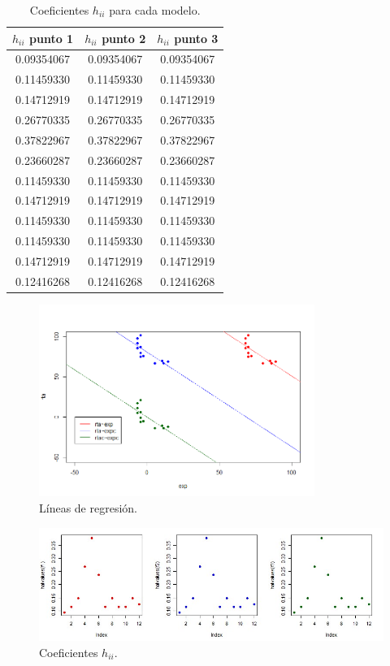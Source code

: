 \documentclass[a4paper]{article}
\begin{document}
\begin{table}
    \centering
    \begin{tabular}{c c c}
    $h_{ii}$ punto 1 & $h_{ii}$ punto 2 &  $h_{ii}$ punto 3 \\ \hline
    0.09354067 & 0.09354067 & 0.09354067 \\
    0.11459330 & 0.11459330 & 0.11459330 \\
    0.14712919 & 0.14712919 & 0.14712919 \\
    0.26770335 &0.26770335 &0.26770335 \\
    0.37822967 &0.37822967 &0.37822967 \\
    0.23660287 &0.23660287 &0.23660287 \\
    0.11459330 &0.11459330 &0.11459330 \\
    0.14712919 &0.14712919 &0.14712919 \\
    0.11459330 &0.11459330 &0.11459330 \\
    0.11459330 &0.11459330 &0.11459330 \\
    0.14712919 &0.14712919 &0.14712919 \\
    0.12416268 & 0.12416268 &0.12416268\\
    \end{tabular}
    \caption{\label{tab:42}Coeficientes $h_{ii}$ para cada modelo.}
\end{table}
\begin{figure}
\centering
\includegraphics[width=0.8\textwidth]{4_1.png}
\caption{\label{fig:f41}Líneas de regresión.}
\end{figure}
\begin{figure}
\centering
\includegraphics[width=1\textwidth]{4_2.jpg}
\caption{\label{fig:f42}Coeficientes $h_{ii}$.}
\end{figure}
\end{document}
